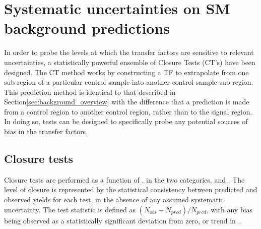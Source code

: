 

\section{Systematic uncertainties on SM background predictions}  %
\label{sec:background_systematics}

In order to probe the levels at which the transfer factors are sensitive to 
relevant uncertainties, a statistically powerful ensemble of Closure Tests
(CT's) have been designed. The CT method works by constructing a TF to
extrapolate from one sub-region of a particular control sample into another 
control sample sub-region. This prediction method is identical to that described
in Section\ref{sec:background_overview} with the difference that a prediction is
made from a control region to another control region, rather than to the signal
region. In doing so, tests can be
designed to specifically probe any potential sources of bias in the transfer factors.

\subsection{Closure tests}
\label{sec:closure_tests}

Closure tests are performed as a function of \HT, in the two \nj categories,
\njlow and \njhigh. The level of closure is represented by the statistical 
consistency between predicted and observed yields for each test, in the absence 
of any assumed systematic uncertainty. The test statistic is defined as $(N_{obs}
- N_{pred}) / N_{pred}$, with any bias being observed as a statistically 
significant deviation from zero, or trend in \HT.

